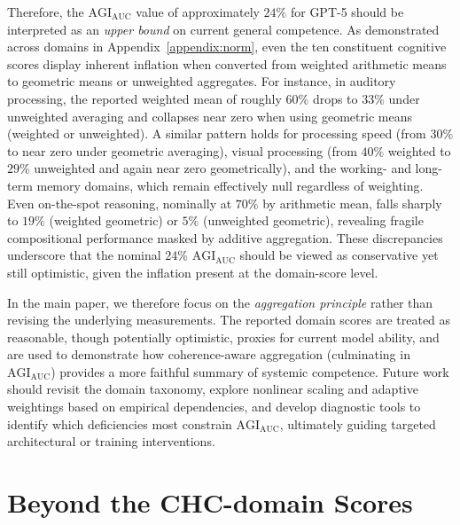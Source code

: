 \documentclass{article}
\begin{document}
Therefore, the $\mathrm{AGI}_{\mathrm{AUC}}$ value of approximately $24\%$ for GPT-5 should be interpreted as an \emph{upper bound} on current general competence.  
As demonstrated across domains in Appendix~\ref{appendix:norm}, even the ten constituent cognitive scores display inherent inflation when converted from weighted arithmetic means to geometric means or unweighted aggregates.  
For instance, in auditory processing, the reported weighted mean of roughly $60\%$ drops to $33\%$ under unweighted averaging and collapses near zero when using geometric means (weighted or unweighted).  
A similar pattern holds for processing speed (from $30\%$ to near zero under geometric averaging), visual processing (from $40\%$ weighted to $29\%$ unweighted and again near zero geometrically), and the working- and long-term memory domains, which remain effectively null regardless of weighting.  
Even on-the-spot reasoning, nominally at $70\%$ by arithmetic mean, falls sharply to $19\%$ (weighted geometric) or $5\%$ (unweighted geometric), revealing fragile compositional performance masked by additive aggregation.  
These discrepancies underscore that the nominal $24\%$ $\mathrm{AGI}_{\mathrm{AUC}}$ should be viewed as conservative yet still optimistic, given the inflation present at the domain-score level.

In the main paper, we therefore focus on the \emph{aggregation principle} rather than revising the underlying measurements.  
The reported domain scores are treated as reasonable, though potentially optimistic, proxies for current model ability, and are used to demonstrate how coherence-aware aggregation (culminating in $\mathrm{AGI}_{\mathrm{AUC}}$) provides a more faithful summary of systemic competence.  
Future work should revisit the domain taxonomy, explore nonlinear scaling and adaptive weightings based on empirical dependencies, and develop diagnostic tools to identify which deficiencies most constrain $\mathrm{AGI}_{\mathrm{AUC}}$, ultimately guiding targeted architectural or training interventions.


\section{Beyond the CHC-domain Scores}
\label{appendix_beyond}
\end{document}
